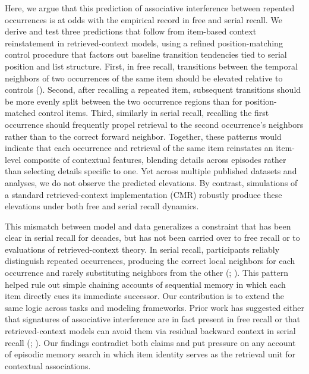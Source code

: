 \documentclass[
  man,
  floatsintext,
  longtable,
  nolmodern,
  notxfonts,
  notimes,
  draftfirst,
  colorlinks=true,linkcolor=blue,citecolor=blue,urlcolor=blue]{apa7}
\begin{document}
Here, we argue that this prediction of associative interference between
repeated occurrences is at odds with the empirical record in free and
serial recall. We derive and test three predictions that follow from
item-based context reinstatement in retrieved-context models, using a
refined position-matching control procedure that factors out baseline
transition tendencies tied to serial position and list structure. First,
in free recall, transitions between the temporal neighbors of two
occurrences of the same item should be elevated relative to controls
(). Second,
after recalling a repeated item, subsequent transitions should be more
evenly split between the two occurrence regions than for
position-matched control items. Third, similarly in serial recall,
recalling the first occurrence should frequently propel retrieval to the
second occurrence's neighbors rather than to the correct forward
neighbor. Together, these patterns would indicate that each occurrence
and retrieval of the same item reinstates an item-level composite of
contextual features, blending details across episodes rather than
selecting details specific to one. Yet across multiple published
datasets and analyses, we do not observe the predicted elevations. By
contrast, simulations of a standard retrieved-context implementation
(CMR) robustly produce these elevations under both free and serial
recall dynamics.

This mismatch between model and data generalizes a constraint that has
been clear in serial recall for decades, but has not been carried over
to free recall or to evaluations of retrieved-context theory. In serial
recall, participants reliably distinguish repeated occurrences,
producing the correct local neighbors for each occurrence and rarely
substituting neighbors from the other
(;
). This
pattern helped rule out simple chaining accounts of sequential memory in
which each item directly cues its immediate successor. Our contribution
is to extend the same logic across tasks and modeling frameworks. Prior
work has suggested either that signatures of associative interference
are in fact present in free recall or that retrieved-context models can
avoid them via residual backward context in serial recall
(;
). Our
findings contradict both claims and put pressure on any account of
episodic memory search in which item identity serves as the retrieval
unit for contextual associations.
\end{document}
